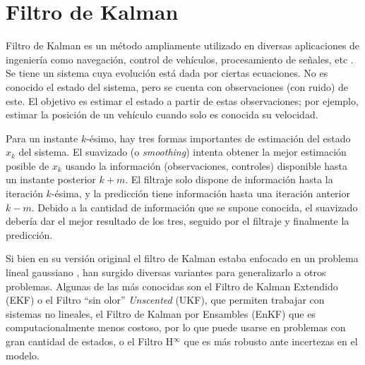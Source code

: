 \section{Filtro de Kalman}\label{sec:kalman}


Filtro de Kalman es un método ampliamente utilizado en diversas aplicaciones de ingeniería como navegación, control de vehículos, procesamiento de señales, etc \cite{Auger2013}. Se tiene un sistema cuya evolución está dada por ciertas ecuaciones. No es conocido el estado del sistema, pero se cuenta con observaciones (con ruido) de este. El objetivo es estimar el estado a partir de estas observaciones; por ejemplo, estimar la posición de un vehículo cuando solo es conocida su velocidad.

Para un instante \(k\)-ésimo, hay tres formas importantes de estimación del estado \(x_k\) del sistema. El suavizado (o \emph{smoothing}) intenta obtener la mejor estimación posible de \(x_k\) usando la información (observaciones, controles) disponible hasta un instante posterior \(k+m\). El filtraje solo dispone de información hasta la iteración \(k\)-ésima, y la predicción tiene información hasta una iteración anterior \(k-m\). Debido a la cantidad de información que se supone conocida, el suavizado debería dar el mejor resultado de los tres, seguido por el filtraje y finalmente la predicción. 

Si bien en su versión original el filtro de Kalman estaba enfocado en un problema lineal gaussiano \cite{Kalman1960}, han surgido diversas variantes para generalizarlo a otros problemas. Algunas de las más conocidas son el Filtro de Kalman Extendido (EKF) o el Filtro ``sin olor'' \textit{Unscented} (UKF), que permiten trabajar con sistemas no lineales, el Filtro de Kalman por Ensambles (EnKF) que es computacionalmente menos costoso, por lo que puede usarse en problemas con gran cantidad de estados, o el Filtro H\(^\infty\) que es más robusto ante incertezas en el modelo. 


